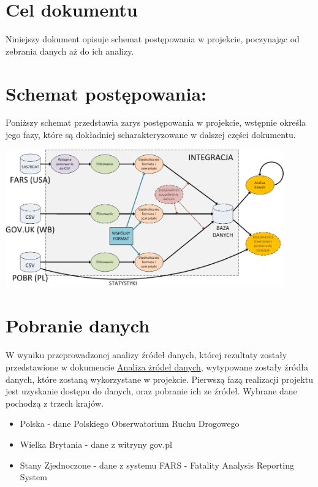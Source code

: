 \section{Cel dokumentu}\label{cel-dokumentu}

Niniejszy dokument opisuje schemat postępowania w projekcie, poczynając
od zebrania danych aż do ich analizy.

\section{Schemat postępowania:}\label{schemat-postepowania}

Poniższy schemat przedstawia zarys postępowania w projekcie, wstępnie
określa jego fazy, które są dokładniej scharakteryzowane w dalszej
części dokumentu.

\centerline{\includegraphics[width=0.9\textwidth]{images/schemat_integracji.png}}

\section{Pobranie danych}\label{pobranie-danych}

W wyniku przeprowadzonej analizy źródeł danych, której rezultaty zostały
przedstawione w dokumencie \href{Analiza-źródeł-danych}{Analiza żródeł
danych}, wytypowane zostały źródła danych, które zostaną wykorzystane w
projekcie. Pierwszą fazą realizacji projektu jest uzyskanie dostępu do
danych, oraz pobranie ich ze źródeł. Wybrane dane pochodzą z trzech
krajów.

\begin{itemize}
\itemsep-14pt\parskip0pt
\item
  Polska - dane Polskiego Obserwatorium Ruchu Drogowego\\
\item
  Wielka Brytania - dane z witryny gov.pl\\
\item
  Stany Zjednoczone - dane z systemu FARS - Fatality Analysis Reporting
  System
\end{itemize}

